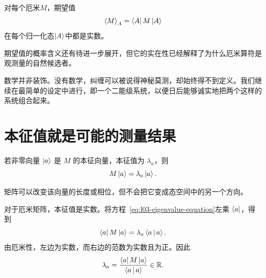 \begin{proposition}
对每个厄米\(M\)，期望值
\begin{equation}
  \left\langle M\right\rangle_A=\left\langle A\right\rvert M\left\lvert A\right\rangle
  \label{eq:l03-expectation}
\end{equation}
在每个归一化态\(\left\lvert A\right\rangle\)中都是实数。
\end{proposition}

期望值的概率含义还有待进一步展开，但它的实在性已经解释了为什么厄米算符是观测量的自然候选者。

\begin{classroomqa}
\end{classroomqa}

\begin{classroomqa}
\end{classroomqa}

数学并非装饰。没有数学，纠缠可以被说得神秘莫测，却始终得不到定义。我们继续在最简单的设定中进行，即一个二能级系统，以便日后能够诚实地把两个这样的系统组合起来。

\section{本征值就是可能的测量结果}

\begin{definition}
若非零向量 \(\left\lvert a\right\rangle\) 是 \(M\) 的本征向量，本征值为 \(\lambda_a\)，则
\begin{equation}
  M\left\lvert a\right\rangle=\lambda_a\left\lvert a\right\rangle.
  \label{eq:l03-eigenvalue-equation}
\end{equation}
\end{definition}
矩阵可以改变该向量的长度或相位，但不会把它变成态空间中的另一个方向。

对于厄米矩阵，本征值是实数。将方程~\eqref{eq:l03-eigenvalue-equation}左乘 \(\left\langle a\right\rvert\)，得到
\begin{equation}
  \left\langle a\right\rvert M\left\lvert a\right\rangle
  =\lambda_a\left\langle a\,\middle|\,a\right\rangle.
\end{equation}
由厄米性，左边为实数，而右边的范数为实数且为正。因此
\begin{equation}
  \lambda_a
  =
  \frac{\left\langle a\right\rvert M\left\lvert a\right\rangle}{\left\langle a\,\middle|\,a\right\rangle}
  \in\mathbb R.
  \label{eq:l03-real-eigenvalue}
\end{equation}

